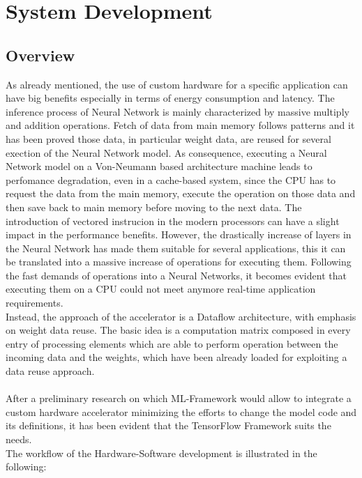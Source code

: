 \chapter{System Development}

\section{Overview}
As already mentioned, the use of custom hardware for a specific application can have big benefits especially in terms of energy consumption and latency.
The inference process of Neural Network is mainly characterized by massive multiply and addition operations. Fetch of data from main memory follows patterns and it has been proved those data, in particular weight data, are reused for several exection of the Neural Network model.
As consequence, executing a Neural Network model on a Von-Neumann based architecture machine leads to perfomance degradation, even in a cache-based system, since the CPU has to request the data from the main memory, execute the operation on those data and then save back to main memory before moving to the next data. The introduction of vectored instrucion in the modern processors can have a slight impact in the performance benefits. However, the drastically increase of layers in the Neural Network has made them suitable for several applications, this it can be translated into a massive increase of operations for executing them. Following the fast demands of operations into a Neural Networks, it becomes evident that executing them on a CPU could not meet anymore real-time application requirements.\\
Instead, the approach of the accelerator is a Dataflow architecture, with emphasis on weight data reuse. The basic idea is a computation matrix composed in every entry of processing elements which are able to perform operation between the incoming data and the weights, which have been already loaded for exploiting a data reuse approach.\\\\
After a preliminary research on which ML-Framework would allow to integrate a custom hardware accelerator minimizing the efforts to change the model code and its definitions, it has been evident that the TensorFlow Framework suits the needs.\\
\newpage
The workflow of the Hardware-Software development is illustrated in the following:
